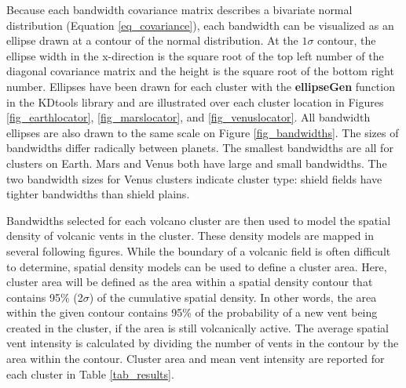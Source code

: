 Because each bandwidth covariance matrix describes a bivariate normal distribution (Equation \ref{eq_covariance}), each bandwidth can be visualized as an ellipse drawn at a contour of the normal distribution. At the $1\sigma$ contour, the ellipse width in the x-direction is the square root of the top left number of the diagonal covariance matrix and the height is the square root of the bottom right number. Ellipses have been drawn for each cluster with the \textbf{ellipseGen} function in the KDtools library and are illustrated over each cluster location in Figures \ref{fig_earthlocator}, \ref{fig_marslocator}, and \ref{fig_venuslocator}. All bandwidth ellipses are also drawn to the same scale on Figure \ref{fig_bandwidths}. The sizes of bandwidths differ radically between planets. The smallest bandwidths are all for clusters on Earth. Mars and Venus both have large and small bandwidths. The two bandwidth sizes for Venus clusters indicate cluster type: shield fields have tighter bandwidths than shield plains.

Bandwidths selected for each volcano cluster are then used to model the spatial density of volcanic vents in the cluster. These density models are mapped in several following figures. While the boundary of a volcanic field is often difficult to determine, spatial density models can be used to define a cluster area. Here, cluster area will be defined as the area within a spatial density contour that contains 95\% (2$\sigma$) of the cumulative spatial density. In other words, the area within the given contour contains 95\% of the probability of a new vent being created in the cluster, if the area is still volcanically active. The average spatial vent intensity is calculated by dividing the number of vents in the contour by the area within the contour. Cluster area and mean vent intensity are reported for each cluster in Table \ref{tab_results}.

